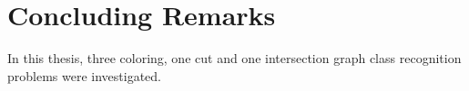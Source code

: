\chapter{Concluding Remarks}
\label{ch:conclusion}

In this thesis, three coloring, one cut and one intersection graph class recognition problems were investigated. 